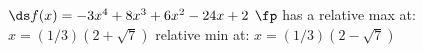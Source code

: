 {$\ds f(x) = -3 x^4+8 x^3+6 x^2-24 x+2$
}
{$\fp$ has a relative max at: $x=(1/3)(2+\sqrt{7})$
relative min at: $x= (1/3)(2-\sqrt{7})$
}
